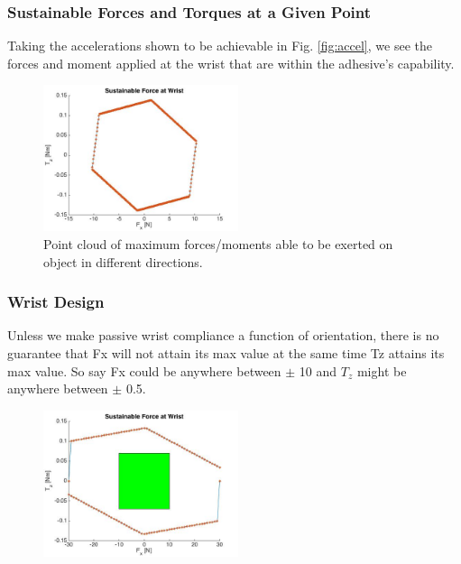 \documentclass{beamer}
\begin{document}
\frame
{
\frametitle{ Sustainable Forces and Torques at a Given Point}

Taking the accelerations shown to be achievable in Fig. \ref{fig:accel}, we see the forces and moment applied at the wrist that are within the adhesive's capability. 

\begin{figure}[htb]
	\centering
	\includegraphics[width=2.25in]{images/FxMzForces.jpg}
	\caption{Point cloud of maximum forces/moments able to be exerted on object in different directions.}
\end{figure}
	
}


\frame
{
\frametitle{ Wrist Design }

Unless we make passive wrist compliance a function of orientation, there is no guarantee that Fx will not attain its max value at the same time Tz attains its max value. 
So say Fx could be anywhere between $\pm$ 10 and $T_{z}$ might be anywhere between $\pm$ 0.5.

\begin{figure}[htb]
	\centering
	\includegraphics[width=2.25in]{images/WristCompliance2D.jpg}
	\caption{}
\end{figure}

}
\end{document}
